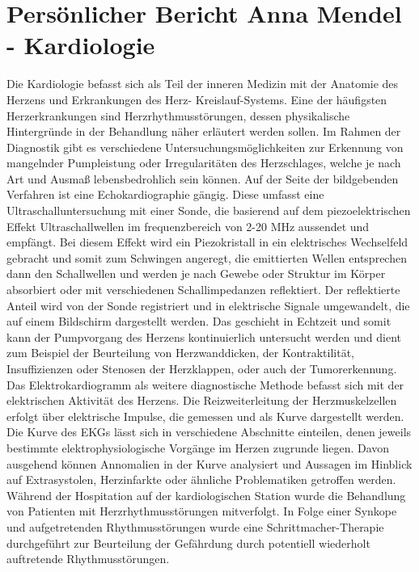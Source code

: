 
    \section{Persönlicher Bericht Anna Mendel - Kardiologie}
    Die Kardiologie befasst sich als Teil der inneren Medizin mit der Anatomie des Herzens und Erkrankungen des Herz-
    Kreislauf-Systems.
    Eine der häufigsten Herzerkrankungen sind Herzrhythmusstörungen, dessen physikalische Hintergründe in der Behandlung näher erläutert werden sollen.
    Im Rahmen der Diagnostik gibt es verschiedene Untersuchungsmöglichkeiten zur Erkennung von mangelnder Pumpleistung oder Irregularitäten
    des Herzschlages, welche je nach Art und Ausmaß lebensbedrohlich sein können.
    Auf der Seite der bildgebenden Verfahren ist eine Echokardiographie gängig.
    Diese umfasst eine Ultraschalluntersuchung mit einer Sonde, die basierend auf dem piezoelektrischen Effekt Ultraschallwellen
    im frequenzbereich von 2-20 MHz aussendet und empfängt.
    Bei diesem Effekt wird ein Piezokristall in ein elektrisches Wechselfeld gebracht und somit zum Schwingen angeregt, die
    emittierten Wellen entsprechen dann den Schallwellen und werden je nach Gewebe oder Struktur im Körper absorbiert oder
    mit verschiedenen Schallimpedanzen reflektiert.
    Der reflektierte Anteil wird von der Sonde registriert und in elektrische Signale umgewandelt, die auf einem Bildschirm dargestellt werden.
    Das geschieht in Echtzeit und somit kann der Pumpvorgang des Herzens kontinuierlich untersucht werden und dient zum Beispiel der Beurteilung von
    Herzwanddicken, der Kontraktilität, Insuffizienzen oder Stenosen der Herzklappen, oder auch der Tumorerkennung.
    Das Elektrokardiogramm als weitere diagnostische Methode befasst sich mit der elektrischen Aktivität des Herzens.
    Die Reizweiterleitung der Herzmuskelzellen erfolgt über elektrische Impulse, die gemessen und als Kurve dargestellt werden.
    Die Kurve des EKGs lässt sich in verschiedene Abschnitte einteilen, denen jeweils bestimmte elektrophysiologische Vorgänge im Herzen zugrunde liegen.
    Davon ausgehend können Annomalien in der Kurve analysiert und Aussagen im Hinblick auf Extrasystolen, Herzinfarkte oder ähnliche Problematiken getroffen werden.
    Während der Hospitation auf der kardiologischen Station wurde die Behandlung von Patienten mit Herzrhythmusstörungen mitverfolgt.
    In Folge einer Synkope und aufgetretenden Rhythmusstörungen wurde eine Schrittmacher-Therapie durchgeführt zur Beurteilung
    der Gefährdung durch potentiell wiederholt auftretende Rhythmusstörungen.

